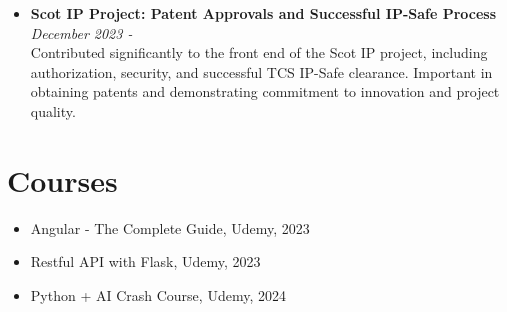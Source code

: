 \documentclass[letterpaper,10pt]{article}
\begin{document}
\begin{multicols}{2}
\begin{itemize}
    \item \textbf{Scot IP Project: Patent Approvals and Successful IP-Safe Process} \\
    \textit{December 2023 -} \\
    Contributed significantly to the front end of the Scot IP project, including authorization, security, and successful TCS IP-Safe clearance. Important in obtaining patents and demonstrating commitment to innovation and project quality.
\end{itemize}

\section*{Courses}
\begin{itemize}
    \item Angular - The Complete Guide, Udemy, 2023
    \item Restful API with Flask, Udemy, 2023
    \item Python + AI Crash Course, Udemy, 2024
\end{itemize}

\end{multicols}
\end{document}
